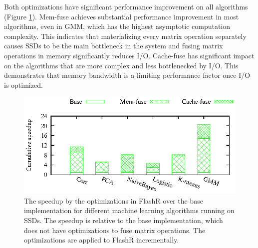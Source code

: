 Both optimizations have significant performance improvement on all algorithms
(Figure \ref{perf:em_opts}). Mem-fuse achieves
substantial performance improvement in most algorithms, even in GMM,
which has the highest asymptotic computation complexity.
This indicates that materializing every matrix operation
separately causes SSDs to be the main bottleneck in the system and
fusing matrix operations in memory significantly reduces I/O.
Cache-fuse has significant impact
on the algorithms that are more complex and less bottlenecked by I/O.
This demonstrates that memory bandwidth is a limiting performance factor
once I/O is optimized.

\begin{figure}
	\begin{center}
		\footnotesize
		\includegraphics{FlashMatrix_figs/opts-EM.eps}
		\vspace{-10pt}
		\caption{The speedup by the optimizations in FlashR over the base
		implementation for different machine learning algorithms running on SSDs.
		The speedup is relative to the base implementation, which does not have
		optimizations to fuse matrix operations. The optimizations are applied
		to FlashR incrementally.}
		\label{perf:em_opts}
	\end{center}
  \vspace{-15pt}
\end{figure}
